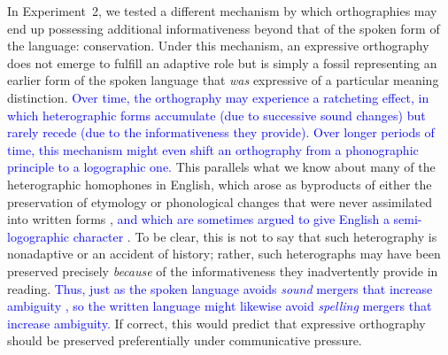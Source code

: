 \documentclass[doc,biblatex]{apa7}
\newcommand\newmaterial[1]{\textcolor{blue}{#1}}
\begin{document}
In Experiment~2, we tested a different mechanism by which orthographies may end up possessing additional informativeness beyond that of the spoken form of the language: conservation. Under this mechanism, an expressive orthography does not emerge to fulfill an adaptive role but is simply a fossil representing an earlier form of the spoken language that \textit{was} expressive of a particular meaning distinction. \newmaterial{Over time, the orthography may experience a ratcheting effect, in which heterographic forms accumulate (due to successive sound changes) but rarely recede (due to the informativeness they provide). Over longer periods of time, this mechanism might even shift an orthography from a phonographic principle to a logographic one.} This parallels what we know about many of the heterographic homophones in English, which arose as byproducts of either the preservation of etymology or phonological changes that were never assimilated into written forms \parencite{Berg:2021}, \newmaterial{and which are sometimes argued to give English a semi-logographic character \parencite{Chomsky:1968, Coulmas:1991, DeFransis:1989, Zachrisson:1931}}. To be clear, this is not to say that such heterography is nonadaptive or an accident of history; rather, such heterographs may have been preserved precisely \textit{because} of the informativeness they inadvertently provide in reading. \newmaterial{Thus, just as the spoken language avoids \textit{sound} mergers that increase ambiguity \parencite[e.g.,][]{Wedel:2013}, so the written language might likewise avoid \textit{spelling} mergers that increase ambiguity.} If correct, this would predict that expressive orthography should be preserved preferentially under communicative pressure.
\end{document}
